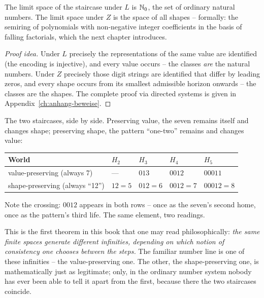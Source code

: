 \begin{satz}[Register S8]\label{satz:grenzen}
The limit space of the staircase under $L$ is $\mathbb N_0$, the set of
ordinary natural numbers. The limit space under $Z$ is the space
of all shapes -- formally: the semiring of polynomials with
non-negative integer coefficients in the basis of falling
factorials, which the next chapter introduces.
\end{satz}

\begin{proof}[Proof idea]
Under $L$ precisely the representations of the same value are
identified (the encoding is injective), and every value occurs --
the classes \emph{are} the natural numbers. Under $Z$ precisely
those digit strings are identified that differ by leading zeros,
and every shape occurs from its smallest admissible horizon
onwards -- the classes are the shapes. The complete proof via
directed systems is given in Appendix~\ref{ch:anhang-beweise}.
\end{proof}

\begin{beispiel}
The two staircases, side by side. Preserving value, the seven
remains itself and changes shape; preserving shape, the pattern
``one-two'' remains and changes value:
\begin{center}
\begin{tabular}{l|llll}
World & $H_2$ & $H_3$ & $H_4$ & $H_5$\\
\hline
value-preserving (always 7) & --- & $013$ & $0012$ & $00011$\\
shape-preserving (always ``12'') & $12=5$ & $012=6$ & $0012=7$ & $00012=8$\\
\end{tabular}
\end{center}
Note the crossing: $0012$ appears in both rows -- once as the
seven's second home, once as the pattern's third life. The same
element, two readings.
\end{beispiel}

This is the first theorem in this book that one may read
philosophically: \emph{the same finite spaces generate different
infinities, depending on which notion of consistency one chooses
between the steps.} The familiar number line is one of these
infinities -- the value-preserving one. The other, the
shape-preserving one, is mathematically just as legitimate; only,
in the ordinary number system nobody has ever been able to tell it
apart from the first, because there the two staircases coincide.

